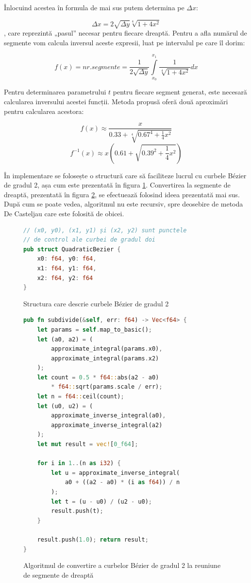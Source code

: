 \documentclass[a4paper, 12pt]{report}
\begin{document}
Înlocuind acestea în formula de mai sus putem determina pe \(\Delta x\):

\[ \Delta x = 2 \sqrt{\Delta y} \sqrt[4]{1 + 4 x^2} \], care reprezintă „pasul” necesar pentru fiecare dreaptă. Pentru a afla numărul de segmente vom calcula inversul aceste expresii,
luat pe intervalul pe care îl dorim:

\[
    f(x) = nr. segmente = \frac{1}{2 \sqrt{\Delta y}} \int\limits_{x_0}^{x_1} \frac{1}{\sqrt[4]{1 + 4x^2}} dx
\]

Pentru determinarea parametrului \(t\) pentru fiecare segment generat, este necesară calcularea inversului acestei funcții. Metoda
propusă oferă două aproximări pentru calcularea acestora:

\[
    f(x) \approx \frac{x}{0.33 + \sqrt[4]{0.67^4 + \frac{1}{4} x^2}}
\]
\[
    f^{-1}(x) \approx x \left( 0.61 + \sqrt{0.39^2 + \frac{1}{4} x^2} \right)
\]

În implementare se folosește o structură care să faciliteze lucrul cu curbele Bézier de gradul 2, așa cum este prezentată în
figura \ref{fig-struct-quadbezier}. Convertirea la segmente de dreaptă, prezentată în figura \ref{fig-quadbezier-subdivide}, se efectuează folosind
ideea prezentată mai sus. După cum se poate vedea, algoritmul nu este recursiv, spre deosebire de metoda De Casteljau \cite{DeCasteljau_algorithm}
care este folosită de obicei.

\begin{figure}[ht]
    \centering
    \begin{lstlisting}[language=Rust]
// (x0, y0), (x1, y1) și (x2, y2) sunt punctele
// de control ale curbei de gradul doi
pub struct QuadraticBezier {
    x0: f64, y0: f64,
    x1: f64, y1: f64,
    x2: f64, y2: f64
}
    \end{lstlisting}
    \caption{Structura care descrie curbele Bézier de gradul 2}
    \label{fig-struct-quadbezier}
\end{figure}

\begin{figure}[ht]
    \centering
    \begin{lstlisting}[language=Rust]
pub fn subdivide(&self, err: f64) -> Vec<f64> {
    let params = self.map_to_basic();
    let (a0, a2) = (
        approximate_integral(params.x0),
        approximate_integral(params.x2)
    );
    let count = 0.5 * f64::abs(a2 - a0)
        * f64::sqrt(params.scale / err);
    let n = f64::ceil(count);
    let (u0, u2) = (
        approximate_inverse_integral(a0),
        approximate_inverse_integral(a2)
    );
    let mut result = vec![0_f64];

    for i in 1..(n as i32) {
        let u = approximate_inverse_integral(
            a0 + ((a2 - a0) * (i as f64)) / n
        );
        let t = (u - u0) / (u2 - u0);
        result.push(t);
    }

    result.push(1.0); return result;
}
    \end{lstlisting}
    \caption{Algoritmul de convertire a curbelor Bézier de gradul 2 la reuniune de segmente de dreaptă}
    \label{fig-quadbezier-subdivide}
\end{figure}
\end{document}
